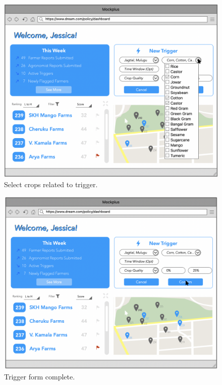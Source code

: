 \begin{figure}[H]
\centering
\includegraphics[scale=0.35]{../images_diagrams/mock_ups/dd/Trig04_Crops.png}
\caption{\label{fig:mockpolicy_selCrops}Select crops related to trigger.}
\end{figure}

\begin{figure}[H]
\centering
\includegraphics[scale=0.35]{../images_diagrams/mock_ups/dd/Trig05_SetUpDone.png}
\caption{\label{fig:mockpolicy_formComplete}Trigger form complete.}
\end{figure}

